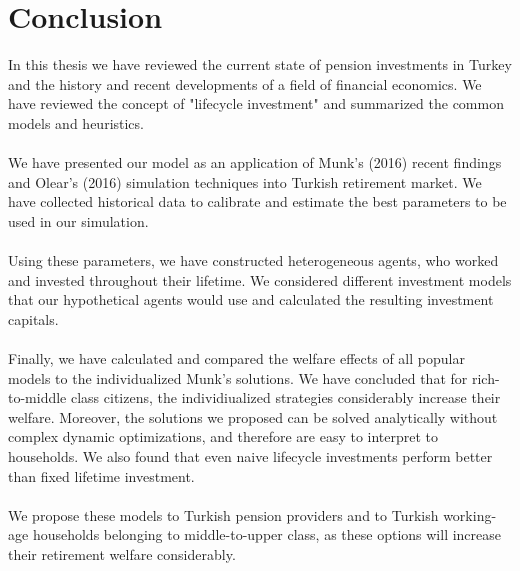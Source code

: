 \documentclass[]{elsarticle}
\begin{document}
\begin{table}
\begin{tabular}[c]{lrrrr}
		\hline
	\end{tabular}
\end{table}
\resetgeometry


\section{Conclusion}
\label{conclusion}

In this thesis we have reviewed the current state of pension investments in Turkey and the history and recent developments of a field of financial economics. We have reviewed the concept of "lifecycle investment" and summarized the common models and heuristics.

\paragraph{}We have presented our model as an application of Munk's (2016) recent findings and Olear's (2016) simulation techniques into Turkish retirement market. We have collected historical data to calibrate and estimate the best parameters to be used in our simulation.

\paragraph{}Using these parameters, we have constructed heterogeneous agents, who worked and invested throughout their lifetime. We considered different investment models that our hypothetical agents would use and calculated the resulting investment capitals.

\paragraph{}Finally, we have calculated and compared the welfare effects of all popular models to the individualized Munk's solutions. We have concluded that for rich-to-middle class citizens, the individiualized strategies considerably increase their welfare. Moreover, the solutions we proposed can be solved analytically without complex dynamic optimizations, and therefore are easy to interpret to households. We also found that even naive lifecycle investments perform better than fixed lifetime investment.

\paragraph{}We propose these models to Turkish pension providers and to Turkish working-age households belonging to middle-to-upper class, as these options will increase their retirement welfare considerably.
\end{document}
